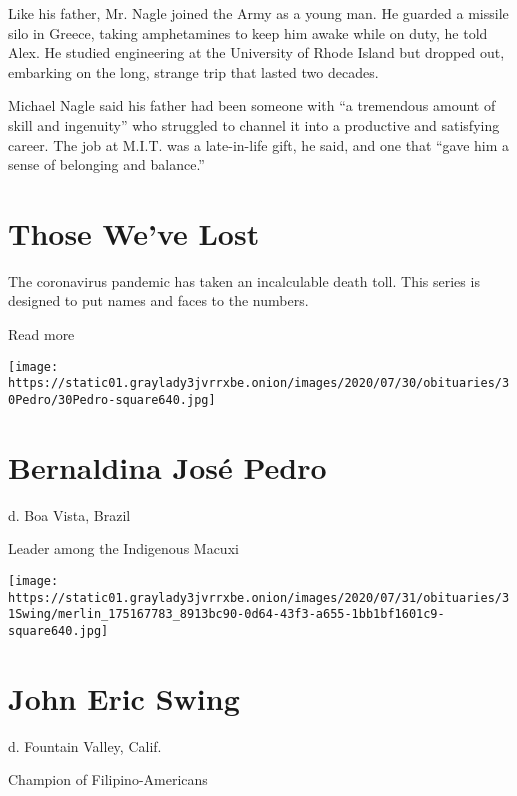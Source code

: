 Like his father, Mr. Nagle joined the Army as a young man. He guarded a
missile silo in Greece, taking amphetamines to keep him awake while on
duty, he told Alex. He studied engineering at the University of Rhode
Island but dropped out, embarking on the long, strange trip that lasted
two decades.

Michael Nagle said his father had been someone with ``a tremendous
amount of skill and ingenuity'' who struggled to channel it into a
productive and satisfying career. The job at M.I.T. was a late-in-life
gift, he said, and one that ``gave him a sense of belonging and
balance.''

\href{https://www.nytimes3xbfgragh.onion/interactive/2020/obituaries/people-died-coronavirus-obituaries.html?action=click\&pgtype=Article\&state=default\&region=BELOW_MAIN_CONTENT\&context=covid_obits_promo}{}

\hypertarget{those-weve-lost}{%
\section{Those We've Lost}\label{those-weve-lost}}

The coronavirus pandemic has taken an incalculable death toll. This
series is designed to put names and faces to the numbers.

Read more

\texttt{[image: https://static01.graylady3jvrrxbe.onion/images/2020/07/30/obituaries/30Pedro/30Pedro-square640.jpg]}

\hypertarget{bernaldina-josuxe9-pedro}{%
\section{Bernaldina José Pedro}\label{bernaldina-josuxe9-pedro}}

d. Boa Vista, Brazil

Leader among the Indigenous Macuxi

\texttt{[image: https://static01.graylady3jvrrxbe.onion/images/2020/07/31/obituaries/31Swing/merlin\_175167783\_8913bc90-0d64-43f3-a655-1bb1bf1601c9-square640.jpg]}

\hypertarget{john-eric-swing}{%
\section{John Eric Swing}\label{john-eric-swing}}

d. Fountain Valley, Calif.

Champion of Filipino-Americans

